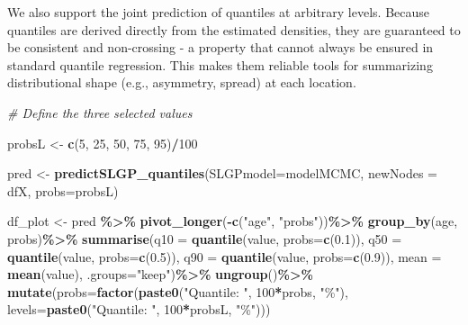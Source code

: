 \documentclass[
]{article}
\newenvironment{Shaded}{\begin{snugshade}}{\end{snugshade}}
\newcommand{\AttributeTok}[1]{\textcolor[rgb]{0.13,0.29,0.53}{#1}}
\newcommand{\CommentTok}[1]{\textcolor[rgb]{0.56,0.35,0.01}{\textit{#1}}}
\newcommand{\DecValTok}[1]{\textcolor[rgb]{0.00,0.00,0.81}{#1}}
\newcommand{\FloatTok}[1]{\textcolor[rgb]{0.00,0.00,0.81}{#1}}
\newcommand{\FunctionTok}[1]{\textcolor[rgb]{0.13,0.29,0.53}{\textbf{#1}}}
\newcommand{\NormalTok}[1]{#1}
\newcommand{\OtherTok}[1]{\textcolor[rgb]{0.56,0.35,0.01}{#1}}
\newcommand{\SpecialCharTok}[1]{\textcolor[rgb]{0.81,0.36,0.00}{\textbf{#1}}}
\newcommand{\StringTok}[1]{\textcolor[rgb]{0.31,0.60,0.02}{#1}}
\begin{document}
We also support the joint prediction of quantiles at arbitrary levels. Because quantiles are derived directly from the estimated densities, they are guaranteed to be consistent and non-crossing - a property that cannot always be ensured in standard quantile regression. This makes them reliable tools for summarizing distributional shape (e.g., asymmetry, spread) at each location.

\begin{Shaded}
\begin{Highlighting}[]
\CommentTok{\# Define the three selected values}

\NormalTok{probsL }\OtherTok{\textless{}{-}} \FunctionTok{c}\NormalTok{(}\DecValTok{5}\NormalTok{, }\DecValTok{25}\NormalTok{, }\DecValTok{50}\NormalTok{, }\DecValTok{75}\NormalTok{, }\DecValTok{95}\NormalTok{)}\SpecialCharTok{/}\DecValTok{100}

\NormalTok{pred }\OtherTok{\textless{}{-}} \FunctionTok{predictSLGP\_quantiles}\NormalTok{(}\AttributeTok{SLGPmodel=}\NormalTok{modelMCMC,}
                              \AttributeTok{newNodes =}\NormalTok{ dfX, }
                              \AttributeTok{probs=}\NormalTok{probsL)}


\NormalTok{df\_plot }\OtherTok{\textless{}{-}}\NormalTok{ pred }\SpecialCharTok{\%\textgreater{}\%}
  \FunctionTok{pivot\_longer}\NormalTok{(}\SpecialCharTok{{-}}\FunctionTok{c}\NormalTok{(}\StringTok{"age"}\NormalTok{, }\StringTok{"probs"}\NormalTok{))}\SpecialCharTok{\%\textgreater{}\%}
  \FunctionTok{group\_by}\NormalTok{(age, probs)}\SpecialCharTok{\%\textgreater{}\%}
  \FunctionTok{summarise}\NormalTok{(}\AttributeTok{q10 =} \FunctionTok{quantile}\NormalTok{(value, }\AttributeTok{probs=}\FunctionTok{c}\NormalTok{(}\FloatTok{0.1}\NormalTok{)),}
            \AttributeTok{q50 =} \FunctionTok{quantile}\NormalTok{(value, }\AttributeTok{probs=}\FunctionTok{c}\NormalTok{(}\FloatTok{0.5}\NormalTok{)),}
            \AttributeTok{q90 =} \FunctionTok{quantile}\NormalTok{(value, }\AttributeTok{probs=}\FunctionTok{c}\NormalTok{(}\FloatTok{0.9}\NormalTok{)),}
            \AttributeTok{mean =} \FunctionTok{mean}\NormalTok{(value), }\AttributeTok{.groups=}\StringTok{"keep"}\NormalTok{)}\SpecialCharTok{\%\textgreater{}\%}
  \FunctionTok{ungroup}\NormalTok{()}\SpecialCharTok{\%\textgreater{}\%}
  \FunctionTok{mutate}\NormalTok{(}\AttributeTok{probs=}\FunctionTok{factor}\NormalTok{(}\FunctionTok{paste0}\NormalTok{(}\StringTok{"Quantile: "}\NormalTok{, }\DecValTok{100}\SpecialCharTok{*}\NormalTok{probs, }\StringTok{"\%"}\NormalTok{),}
                      \AttributeTok{levels=}\FunctionTok{paste0}\NormalTok{(}\StringTok{"Quantile: "}\NormalTok{, }\DecValTok{100}\SpecialCharTok{*}\NormalTok{probsL, }\StringTok{"\%"}\NormalTok{)))}



\end{Highlighting}
\end{Shaded}
\end{document}
